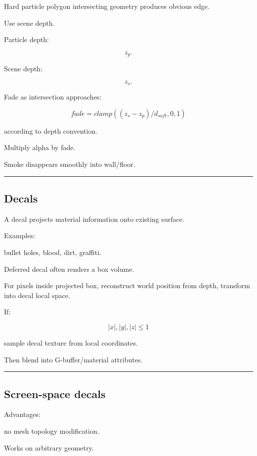 Hard particle polygon intersecting geometry produces obvious edge.

Use scene depth.

Particle depth:

\[
z_p.
\]

Scene depth:

\[
z_s.
\]

Fade as intersection approaches:

\[
\boxed{
fade=
clamp(
(z_s-z_p)/d_{soft},
0,1
)
}
\]

according to depth convention.

Multiply alpha by fade.

Smoke disappears smoothly into wall/floor.

\begin{center}\rule{0.5\linewidth}{0.5pt}\end{center}

\subsection{Decals}\label{04-visual-computing-ii-ch040-decals}

A decal projects material information onto existing surface.

Examples:

bullet holes, blood, dirt, graffiti.

Deferred decal often renders a box volume.

For pixels inside projected box, reconstruct world position from depth, transform into decal local space.

If:

\[
|x|,|y|,|z|\le1
\]

sample decal texture from local coordinates.

Then blend into G-buffer/material attributes.

\begin{center}\rule{0.5\linewidth}{0.5pt}\end{center}

\subsection{Screen-space decals}\label{04-visual-computing-ii-ch040-screen-space-decals}

Advantages:

no mesh topology modification.

Works on arbitrary geometry.

